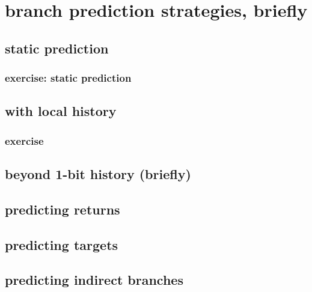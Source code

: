 \section{branch prediction strategies, briefly}

\subsection{static prediction}


\subsubsection{exercise: static prediction}


\subsection{with local history}


\subsubsection{exercise}


\subsection{beyond 1-bit history (briefly)}


\subsection{predicting returns}


\subsection{predicting targets}


\subsection{predicting indirect branches}

